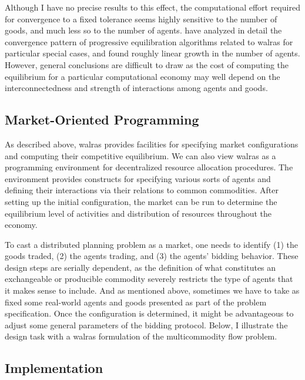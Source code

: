 Although I have no precise results to this effect, the computational 
effort required for convergence to a fixed tolerance seems highly sensitive to 
the number of goods, and much less so to the number of agents.  
 have analyzed in detail the convergence pattern
of progressive equilibration algorithms related to {\sc walras} for
particular special cases, and found roughly linear 
growth in the number of agents.  However, general conclusions are 
difficult to draw as the cost of computing the equilibrium for a particular 
computational economy may well 
depend on the interconnectedness and strength of interactions among 
agents and goods.

\subsection{Market-Oriented Programming}

As described above, {\sc walras} provides facilities for specifying 
market configurations and computing their competitive equilibrium.
We can also view {\sc walras} as a programming environment for 
decentralized resource allocation procedures.
The environment provides constructs for specifying various sorts of 
agents and defining their interactions via their relations to common 
commodities.
After setting up the initial configuration, the market can be run to 
determine the equilibrium level of activities and distribution of 
resources throughout the economy.

To cast a distributed planning problem as a market, one needs to identify 
(1) the goods traded, (2) the agents trading, and (3) the agents' bidding
behavior.
These design steps are serially dependent, as the definition of what 
constitutes an exchangeable or producible commodity severely restricts 
the type of agents that it makes sense to include.
And as mentioned above, sometimes we have to take as fixed some 
real-world agents and goods presented as part of the problem specification.
Once the configuration is determined, it might be advantageous to adjust
some general parameters of the bidding protocol.
Below, I illustrate the design task with a {\sc 
walras} formulation of the multicommodity flow problem.

\subsection{Implementation}

